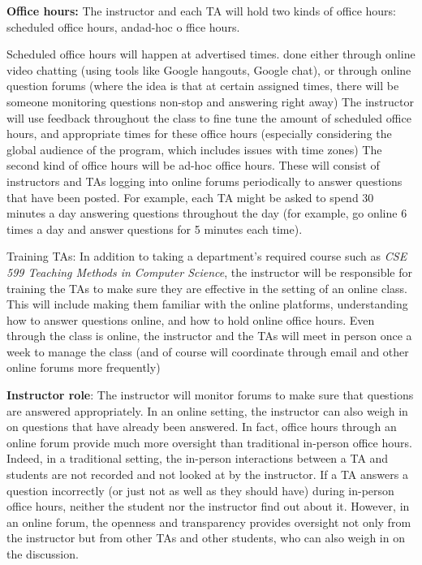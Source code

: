 \documentclass[11pt,letterpaper]{article}
\begin{document}
{\bf Office hours:} The instructor and each TA will hold two kinds of
office hours: ​scheduled ​office hours, and ​ad-hoc o​ ffice hours.

Scheduled office​ ​hours ​will happen at advertised times. done either
through online video chatting (using tools like Google hangouts,
Google chat), or through online question forums (where the idea is
that at certain assigned times, there will be someone monitoring
questions non-stop and answering right away) The instructor will use
feedback throughout the class to fine tune the amount of scheduled
office hours, and appropriate times for these office hours (especially
considering the global audience of the program, which includes issues
with time zones) The second kind of office hours will be ​ad-hoc office
hours.​ These will consist of instructors and TAs logging into online
forums periodically to answer questions that have been posted. For
example, each TA might be asked to spend 30 minutes a day answering
questions throughout the day (for example, go online 6 times a day and
answer questions for 5 minutes each time).

{Training TAs}: In addition to taking a department’s required course
such as {\em CSE 599 Teaching Methods in Computer Science}, the instructor
will be responsible for training the TAs to make sure they are
effective in the setting of an online class. This will include making
them familiar with the online platforms, understanding how to answer
questions online, and how to hold online office hours. Even through
the class is online, the instructor and the TAs will meet in person
once a week to manage the class (and of course will coordinate through
email and other online forums more frequently)

{\bf Instructor role}:​ The instructor will monitor forums to make sure
that questions are answered appropriately. In an online setting, the
instructor can also weigh in on questions that have already been
answered. In fact, office hours through an online forum provide much
more oversight than traditional in-person office hours. Indeed, in a
traditional setting, the in-person interactions between a TA and
students are not recorded and not looked at by the instructor. If a TA
answers a question incorrectly (or just not as well as they should
have) during in-person office hours, neither the student nor the
instructor find out about it. However, in an online forum, the
openness and transparency provides oversight not only from the
instructor but from other TAs ​and ​other students, who can also weigh
in on the discussion.
\end{document}
